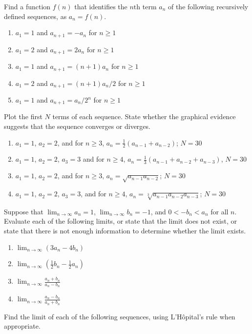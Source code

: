 \documentclass{exercises}
\begin{document}
Find a function $f(n)$ that identifies the $n\text{th}$ term $a_{n}$ of the following recursively defined sequences, as $a_{n}=f(n)$.

\begin{enumerate}[resume]
\item $a_{1}=1$ and $a_{n+1}=-a_{n}$ for $n\ge1$
\item $a_{1}=2$ and $a_{n+1}=2a_{n}$ for $n\ge1$
\item $a_{1}=1$ and $a_{n+1}=(n+1)a_{n}$ for $n\ge1$
\item $a_{1}=2$ and $a_{n+1}=(n+1)a_{n}/2$ for $n\ge1$
\item $a_{1}=1$ and $a_{n+1}=a_{n}/2^{n}$ for $n\ge1$
\end{enumerate}

Plot the first $N$ terms of each sequence. State whether the graphical evidence suggests that the sequence converges or diverges.

\begin{enumerate}[resume]
\item \techrequired $a_{1}=1$, $a_{2}=2$, and for $n\ge3$, $a_{n}=\frac{1}{2}(a_{n-1}+a_{n-2})$; $N=30$
\item \techrequired $a_{1}=1$, $a_{2}=2$, $a_{3}=3$ and for $n\ge4$, $a_{n}=\frac{1}{3}(a_{n-1}+a_{n-2}+a_{n-3})$, $N=30$
\item \techrequired $a_{1}=1$, $a_{2}=2$, and for $n\ge3$, $a_{n}=\sqrt{a_{n-1}a_{n-2}}$; $N=30$
\item \techrequired $a_{1}=1$, $a_{2}=2$, $a_{3}=3$, and for $n\ge4$, $a_{n}=\sqrt[3]{a_{n-1}a_{n-2}a_{n-3}}$; $N=30$
\end{enumerate}

Suppose that $\lim_{n\to \infty}a_{n}=1$, $\lim_{n\to \infty}b_{n}=-1$, and $0<-b_{n}<a_{n}$ for all $n$. Evaluate each of the following limits, or state that the limit does not exist, or state that there is not enough information to determine whether the limit exists.

\begin{enumerate}[resume]
\item $\lim_{n\to \infty}(3a_{n}-4b_{n})$
\item $\lim_{n\to \infty}(\frac{1}{2}b_{n}-\frac{1}{2}a_{n})$
\item $\lim_{n\to \infty}\frac{a_{n}+b_{n}}{a_{n}-b_{n}}$
\item $\lim_{n\to \infty}\frac{a_{n}-b_{n}}{a_{n}+b_{n}}$
\end{enumerate}

Find the limit of each of the following sequences, using L'Hôpital's rule when appropriate.
\end{document}
